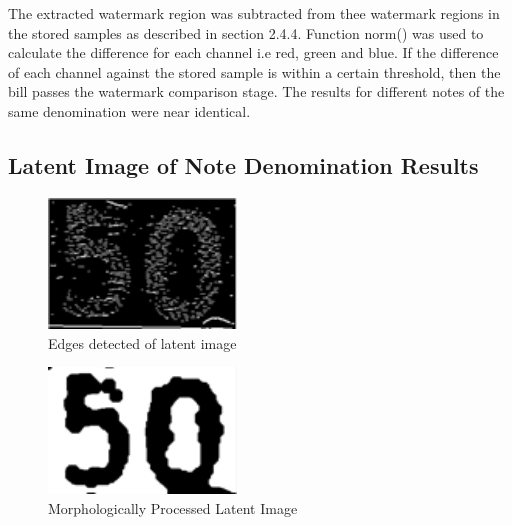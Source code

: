 \documentclass{article}
\begin{document}
The extracted watermark region was subtracted from thee watermark regions in the stored samples as described in section 2.4.4. Function norm() was used to calculate the difference for each channel i.e red, green and blue. If the difference of each channel against the stored sample is within a certain threshold, then the bill passes the watermark comparison stage. The results for different notes of the same denomination were near identical.

\subsection{Latent Image of Note Denomination Results}

\begin{figure}[h!]

\begin{minipage}[b]{1.0\linewidth}
  \centering
  \centerline{\includegraphics[width=5cm]{l1.png}}
  \vspace{-3mm}
\end{minipage}
%
\caption{Edges detected of latent image}
\label{fig:l1}
\vspace{-3mm}
\end{figure}

\begin{figure}[h!]

\begin{minipage}[b]{1.0\linewidth}
  \centering
  \centerline{\includegraphics[width=5cm]{l2.png}}
  \vspace{-3mm}
\end{minipage}
%
\caption{Morphologically Processed Latent Image}
\label{fig:l2}
\vspace{-3mm}
\end{figure}
\end{document}
